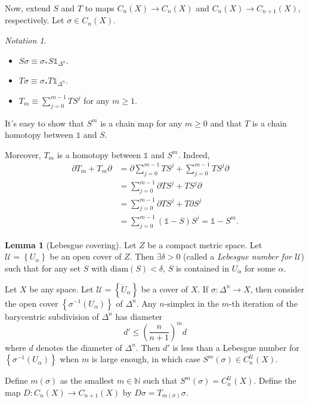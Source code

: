 \documentclass[10pt,letterpaper,cm]{nupset}
\theoremstyle{definition}
\theoremstyle{theorem}
\newtheorem{lemma}[definition]{Lemma}
\theoremstyle{remark}
\newtheorem*{notation}{Notation}
\newcommand{\N}{\mathbb N}
\newcommand{\U}{\mathcal U}
\newcommand{\1}{\mathbb{1}}
\newcommand{\0}{\vec 0}
\begin{document}
Now, extend $S$ and $T$ to maps $C_n(X) \to C_n(X)$ and $C_n(X) \to C_{n+1}(X)$, respectively. Let $\sigma \in C_n(X)$.
\begin{notation} $ $
\begin{itemize}
\item $S{\sigma} \equiv \sigma_{\ast}{S{\1_{\Delta^n}}}$.
\item  $T{\sigma} \equiv \sigma_{\ast}{T{\1_{\Delta^n}}}.$
\item $T_m \equiv \sum_{j=0}^{m-1} TS^j $ for any $m\geq 1$.
\end{itemize}
\end{notation}

It's easy to show that $S^m$ is a chain map for any $m\geq 0$ and that $T$ is a chain homotopy between $\1$ and $S$.

\medskip

Moreover, $T_m$ is a homotopy between $\1$ and $S^m$. Indeed,
\begin{align*}
 \partial{T_m} +T_m{\partial} & = \partial{ \sum_{j=0}^{m-1} TS^j} + \sum_{j=0}^{m-1} TS^j{\partial} 
 \\ & = \sum_{j=0}^{m-1} \partial{TS^j} +TS^j{\partial}
 \\ & =  \sum_{j=0}^{m-1} \partial{TS^j} +T\partial{S^j}
 \\ & = \sum_{j=0}^{m-1}(\1 -S)S^j = \1 - S^m.
\end{align*}


\begin{lemma}[Lebesgue covering]
Let $Z$ be a compact metric space. Let $\U =\left\{U_{\alpha}\right\}$ be an open cover of $Z$. Then $\exists \delta >0$ (called a \textit{Lebesgue number for $\U$}) such that for any set $S$ with $\text{diam}(S) < \delta$, $S$ is contained in $U_{\alpha}$ for some $\alpha$.
\end{lemma}

\smallskip

Let $X$ be any space.  Let $\U =\left\{\mathring{U}_{\alpha}\right\}$ be a cover of $X$. If $\sigma : \Delta^n \to X$, then consider the open cover $\left\{ \sigma^{-1}(U_{\alpha})\right\} $ of $\Delta^n$. Any $n$-simplex in the $m$-th iteration of the barycentric subdivision of $\Delta^n$ has diameter $$d' \leq \left(\frac{n}{n+1}\right)^md$$ where $d$ denotes the diameter of $\Delta^n$. Then $d'$ is less than a Lebesgue number for $\left\{ \sigma^{-1}(U_{\alpha})\right\}$ when $m$ is large enough, in which case $S^m(\sigma) \in C_n^{\U}(X)$.

Define $m(\sigma)$ as the smallest $m\in \N$ such that $S^m(\sigma) =C_n^{\U}(X)$. Define the map $D: C_n(X) \to  C_{n+1}(X)$ by $D{\sigma} =T_{m(\sigma)}{\sigma}$.
\end{document}
